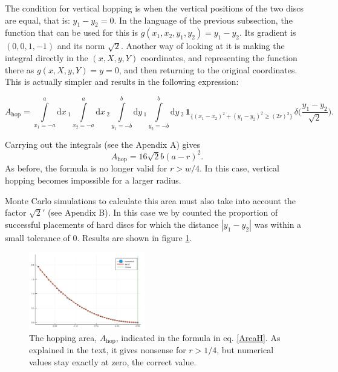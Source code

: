 \documentclass[superscriptaddress,pre,reprint,showpacs,onecolumn]{revtex4-1}
\newcommand{\rd}[1]{\mathrm{d}{#1} \,}
\newcommand{\indicatorsymbol}{\mathbf{1}}
\newcommand{\indicator}[1]{\indicatorsymbol_{ \{   #1 \} } }
\begin{document}
The condition for vertical hopping is when the vertical positions of the two discs are equal, that is: $y_1-y_2=0$. In the language of the previous subsection, the function
that can be used for this is $g(x_1, x_2, y_1, y_2)= y_1-y_2$. Its gradient is $(0,0,1,-1)$ and its norm $\sqrt{2}$. Another way of looking at it is making the integral
directly in the $(x,X,y,Y)$ coordinates, and representing the function there as
$g(x,X,y,Y)=y=0$, and then returning to the original coordinates. This is actually
simpler and results in the following expression:
\begin{widetext}
\begin{equation}
 A_\text{hop} = \int\limits_{x_1 = -a}^a \rd x_1 \int\limits_{x_2 = -a}^a \rd x_2 
\int\limits_{y_1 = -b}^b \rd y_1 \int\limits_{y_2 = -b}^b \rd y_2 \, \indicator{ (x_1-x_2)^2 + (y_1-y_2)^2 \ge (2r)^2 } \, \delta \big(\frac{y_1-y_2}{\sqrt{2}}\big).
\end{equation}
\end{widetext}
Carrying out the integrals  (see the Apendix A) gives
 \begin{equation}\label{AreaH}
 A_\text{hop}  =  16 \sqrt{2} b(a-r)^2.
\end{equation}
As before, the formula is no longer valid for $r > w/4$. In this case,
vertical hopping becomes impossible for a larger radius.

Monte Carlo simulations to calculate this area must also
take into account the factor $\sqrt{2}'$ (see Apendix B).
In this case we 
by counted the proportion of successful placements of hard discs 
for which the distance 
$|y_1 - y_2|$ was within a small tolerance of $0$. 
Results are shown in figure \ref{AreaHopp01}.

\begin{figure}[h]
\centering
\includegraphics[width=0.45\textwidth]{./figures/AreaHop01.png}
\caption{The hopping area, $A_\text{hop}$, 
  indicated in the formula in eq. \ref{AreaH}. As explained
in the text, it gives nonsense for $r>1/4$, but numerical values stay
exactly at zero, the correct value. } 
\label{AreaHopp01}
\end{figure}
\end{document}
